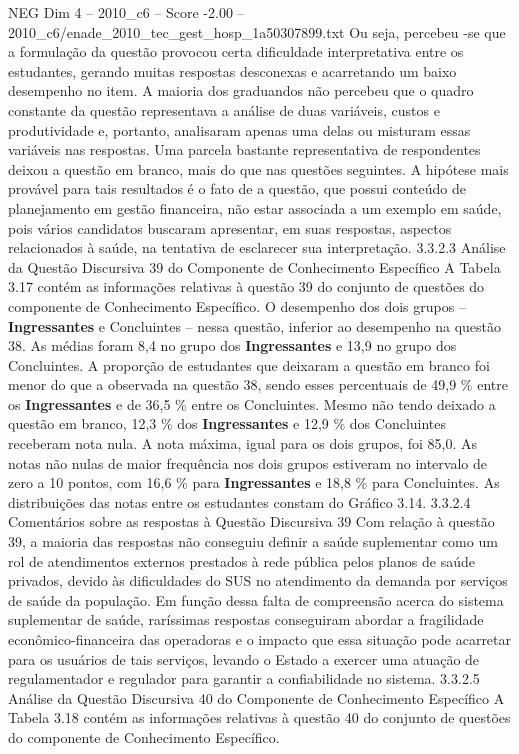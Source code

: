 \begin{textsample}{NEG Dim 4 – 2010\_c6 – Score -2.00 – 2010\_c6/enade\_2010\_tec\_gest\_hosp\_1a50307899.txt}
Ou seja, percebeu -se que a formulação da questão provocou certa dificuldade interpretativa entre os estudantes, gerando muitas respostas desconexas e acarretando um baixo desempenho no item.
A maioria dos graduandos não percebeu que o quadro constante da questão representava a análise de duas variáveis, custos e produtividade e, portanto, analisaram apenas uma delas ou misturam essas variáveis nas respostas.
Uma parcela bastante representativa de respondentes deixou a questão em branco, mais do que nas questões seguintes.
A hipótese mais provável para tais resultados é o fato de a questão, que possui conteúdo de planejamento em gestão financeira, não estar associada a um exemplo em saúde, pois vários candidatos buscaram apresentar, em suas respostas, aspectos relacionados à saúde, na tentativa de esclarecer sua interpretação. 3.3.2.3 Análise da Questão Discursiva 39 do Componente de Conhecimento Específico A Tabela 3.17 contém as informações relativas à questão 39 do conjunto de questões do componente de Conhecimento Específico.
O desempenho dos dois grupos – \textbf{Ingressantes} e Concluintes – nessa questão, inferior ao desempenho na questão 38.
As médias foram 8,4 no grupo dos \textbf{Ingressantes} e 13,9 no grupo dos Concluintes.
A proporção de estudantes que deixaram a questão em branco foi menor do que a observada na questão 38, sendo esses percentuais de 49,9 \% entre os \textbf{Ingressantes} e de 36,5 \% entre os Concluintes.
Mesmo não tendo deixado a questão em branco, 12,3 \% dos \textbf{Ingressantes} e 12,9 \% dos Concluintes receberam nota nula.
A nota máxima, igual para os dois grupos, foi 85,0.
As notas não nulas de maior frequência nos dois grupos estiveram no intervalo de zero a 10 pontos, com 16,6 \% para \textbf{Ingressantes} e 18,8 \% para Concluintes.
As distribuições das notas entre os estudantes constam do Gráfico 3.14. 3.3.2.4 Comentários sobre as respostas à Questão Discursiva 39 Com relação à questão 39, a maioria das respostas não conseguiu definir a saúde suplementar como um rol de atendimentos externos prestados à rede pública pelos planos de saúde privados, devido às dificuldades do SUS no atendimento da demanda por serviços de saúde da população.
Em função dessa falta de compreensão acerca do sistema suplementar de saúde, raríssimas respostas conseguiram abordar a fragilidade econômico-financeira das operadoras e o impacto que essa situação pode acarretar para os usuários de tais serviços, levando o Estado a exercer uma atuação de regulamentador e regulador para garantir a confiabilidade no sistema. 3.3.2.5 Análise da Questão Discursiva 40 do Componente de Conhecimento Específico A Tabela 3.18 contém as informações relativas à questão 40 do conjunto de questões do componente de Conhecimento Específico.

\end{textsample}
